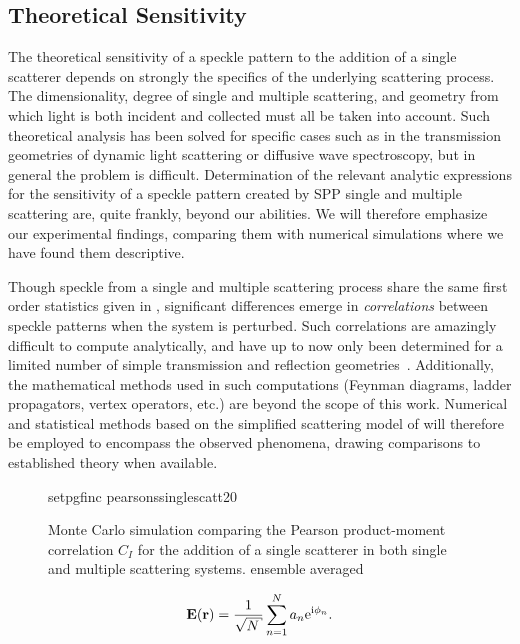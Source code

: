 \subsection{Theoretical Sensitivity}
The theoretical sensitivity of a speckle pattern to the addition of a
single scatterer depends on strongly the specifics of the underlying
scattering process.  The dimensionality, degree of single and multiple
scattering, and geometry from which light is both incident and collected
must all be taken into account.  Such theoretical analysis has been solved
for specific cases such as in the transmission geometries of dynamic light
scattering or diffusive wave spectroscopy, but in general the problem is
difficult.  Determination of the relevant analytic expressions for the
sensitivity of a speckle pattern created by SPP single and multiple
scattering are, quite frankly, beyond our abilities.  We will therefore
emphasize our experimental findings, comparing them with numerical
simulations where we have found them descriptive.

Though speckle from a single and multiple scattering process share the same
first order statistics given in , significant differences
emerge in \textit{correlations} between speckle patterns when the system is
perturbed.  Such correlations are amazingly difficult to compute analytically,
and have up to now only been determined for a limited number of simple
transmission and reflection geometries~\cite{berkovits1994correlations}.
Additionally, the mathematical methods used in such computations (Feynman
diagrams, ladder propagators, vertex operators, etc.) are beyond the scope of
this work.  Numerical and statistical methods based on the simplified
scattering model of  will therefore be employed
to encompass the observed phenomena, drawing comparisons to established theory
when available.

\begin{figure}
\centering
{setpgfinc}
{pearsonssinglescatt20}
\caption{Monte Carlo simulation comparing the Pearson product-moment
				correlation $C_I$ for the addition of a single scatterer in both
				single and multiple scattering systems. ensemble averaged}
\label{fig:scatteringpearson}
\end{figure}


\begin{equation}
\mathbf{E}(\mathbf{r}) = \frac{1}{\sqrt{N}} \sum_{n=1}^{N} a_n \me^{\mi \phi_n}.
\label{eqn:phasorsumdingus}
\end{equation}

